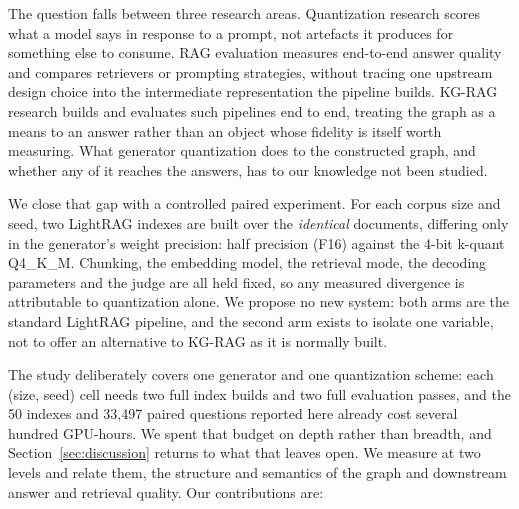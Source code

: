 \documentclass[conference, table]{IEEEtran}
\newcommand{\fsixteen}{F16}
\newcommand{\qfour}{Q4\_K\_M}
\begin{document}
\noindent
The question falls between three research areas. Quantization research scores what a model says in response to a prompt, not artefacts it produces for something else to consume. RAG evaluation measures end-to-end answer quality and compares retrievers or prompting strategies, without tracing one upstream design choice into the intermediate representation the pipeline builds. KG-RAG research builds and evaluates such pipelines end to end, treating the graph as a means to an answer rather than an object whose fidelity is itself worth measuring. What generator quantization does to the constructed graph, and whether any of it reaches the answers, has to our knowledge not been studied.

\noindent
We close that gap with a controlled paired experiment. For each corpus size and seed, two LightRAG indexes are built over the \emph{identical} documents, differing only in the generator's weight precision: half precision (\fsixteen) against the 4-bit k-quant \qfour. Chunking, the embedding model, the retrieval mode, the decoding parameters and the judge are all held fixed, so any measured divergence is attributable to quantization alone. We propose no new system: both arms are the standard LightRAG pipeline, and the second arm exists to isolate one variable, not to offer an alternative to KG-RAG as it is normally built.

\noindent
The study deliberately covers one generator and one quantization scheme: each (size, seed) cell needs two full index builds and two full evaluation passes, and the 50 indexes and 33{,}497 paired questions reported here already cost several hundred GPU-hours. We spent that budget on depth rather than breadth, and Section~\ref{sec:discussion} returns to what that leaves open. We measure at two levels and relate them, the structure and semantics of the graph and downstream answer and retrieval quality. Our contributions are:
\end{document}
